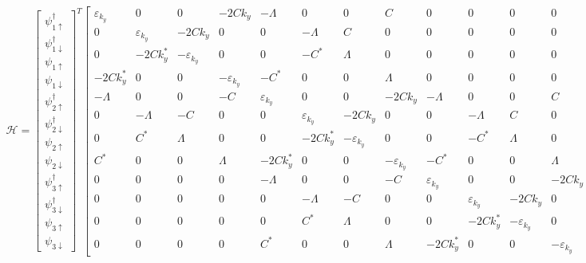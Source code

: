 \documentclass{jarticle}
\begin{document}
\begin{align}
\mathcal{H}=
\begin{bmatrix}
\psi_{1\uparrow}^\dagger \\ 
\psi_{1\downarrow}^\dagger \\ 
\psi_{1\uparrow} \\ 
\psi_{1\downarrow} \\ 
\psi_{2\uparrow}^\dagger \\ 
\psi_{2\downarrow}^\dagger \\ 
\psi_{2\uparrow} \\ 
\psi_{2\downarrow} \\ 
\psi_{3\uparrow}^\dagger \\ 
\psi_{3\downarrow}^\dagger \\ 
\psi_{3\uparrow} \\ 
\psi_{3\downarrow}
\end{bmatrix} 
^T
\begin{bmatrix}
\varepsilon_{k_y} & 0 & 0 & -2Ck_{y} & -\Lambda & 0 & 0 & C & 0 & 0 & 0 & 0 \\ 
0 & \varepsilon_{k_y} & -2Ck_{y} & 0 & 0 & -\Lambda & C & 0 & 0 & 0 & 0 & 0 \\ 
0 & -2Ck_{y}^{*} & -\varepsilon_{k_y} & 0 & 0 & -C^{*} & \Lambda & 0 & 0 & 0 & 0 & 0 \\ 
-2Ck_{y}^{*} & 0 & 0 & -\varepsilon_{k_y} & -C^{*} & 0 & 0 & \Lambda & 0 & 0 & 0 & 0 \\ 
-\Lambda & 0 & 0 & -C & \varepsilon_{k_y} & 0 & 0 & -2Ck_{y} & -\Lambda & 0 & 0 & C \\ 
0 & -\Lambda & -C & 0 & 0 & \varepsilon_{k_y} & -2Ck_{y} & 0 & 0 & -\Lambda & C & 0 \\ 
0 & C^{*} & \Lambda & 0 & 0 & -2Ck_{y}^{*} & -\varepsilon_{k_y} & 0 & 0 & -C^{*} & \Lambda & 0 \\ 
C^{*} & 0 & 0 & \Lambda & -2Ck_{y}^{*} & 0 & 0 & -\varepsilon_{k_y} & -C^{*} & 0 & 0 & \Lambda \\ 
0 & 0 & 0 & 0 & -\Lambda & 0 & 0 & -C & \varepsilon_{k_y} & 0 & 0 & -2Ck_{y} \\ 
0 & 0 & 0 & 0 & 0 & -\Lambda & -C & 0 & 0 & \varepsilon_{k_y} & -2Ck_{y} & 0 \\ 
0 & 0 & 0 & 0 & 0 & C^{*} & \Lambda & 0 & 0 & -2Ck_{y}^{*} & -\varepsilon_{k_y} & 0 \\ 
0 & 0 & 0 & 0 & C^{*} & 0 & 0 & \Lambda & -2Ck_{y}^{*} & 0 & 0 & -\varepsilon_{k_y}
\end{bmatrix} 
\begin{bmatrix}
\psi_{1\uparrow} \\ 

\end{bmatrix}
\end{align}
\end{document}
